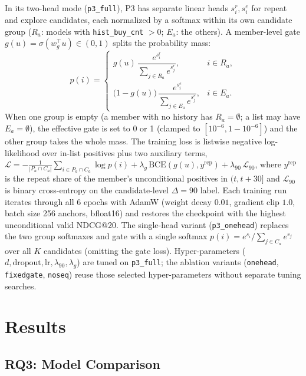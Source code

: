 \documentclass{ieeeaccess}
\begin{document}
In its two-head mode (\texttt{p3\_full}), P3 has separate linear heads $s^r_i, s^e_i$ for repeat and explore candidates, each normalized by a softmax within its own candidate group ($R_a$: models with \texttt{hist\_buy\_cnt} $> 0$; $E_a$: the others). A member-level gate $g(u) = \sigma(w_g^\top u) \in (0, 1)$ splits the probability mass:
\begin{equation}
p(i) = \begin{cases}
g(u)\, \dfrac{e^{s^{r}_i}}{\sum_{j \in R_a} e^{s^{r}_j}}, & i \in R_a,\\[2ex]
\bigl(1 - g(u)\bigr)\, \dfrac{e^{s^{e}_i}}{\sum_{j \in E_a} e^{s^{e}_j}}, & i \in E_a.
\end{cases}
\end{equation}
When one group is empty (a member with no history has $R_a = \emptyset$; a list may have $E_a = \emptyset$), the effective gate is set to 0 or 1 (clamped to $[10^{-6}, 1-10^{-6}]$)
and the other group takes the whole mass. The training loss is listwise negative log-likelihood over in-list positives plus two auxiliary terms, $\mathcal{L} = -\frac{1}{|P_a \cap C_a|}\sum_{i \in P_a \cap C_a} \log p(i) + \lambda_g\,\mathrm{BCE}(g(u), y^{\mathrm{rep}})
+ \lambda_{90}\,\mathcal{L}_{90}$, where $y^{\mathrm{rep}}$ is the repeat share of the member's unconditional positives in $(t, t+30]$ and $\mathcal{L}_{90}$ is binary cross-entropy on the candidate-level $\Delta = 90$ label. Each training run iterates through all 6 epochs with AdamW ($\text{weight decay } 0.01$, gradient clip $1.0$, batch size 256 anchors, bfloat16) and restores the checkpoint with the highest unconditional valid NDCG@20. The single-head variant (\texttt{p3\_onehead}) replaces the two group softmaxes and gate with a single softmax $p(i) = e^{s_i}/\sum_{j \in C_a} e^{s_j}$ over all $K$ candidates (omitting the gate loss). Hyper-parameters ($d, \text{dropout}, \text{lr}, \lambda_{90}, \lambda_g$) are tuned on \texttt{p3\_full}; the ablation variants (\texttt{onehead}, \texttt{fixedgate}, \texttt{noseq}) reuse those selected hyper-parameters without separate tuning searches.

\section{Results}
\label{sec:results}

\subsection{RQ3: Model Comparison}
\end{document}
